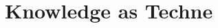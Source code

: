 ﻿\documentclass[11pt]{amsart}
\begin{document}































\section{Knowledge as Techne}
\end{document}
